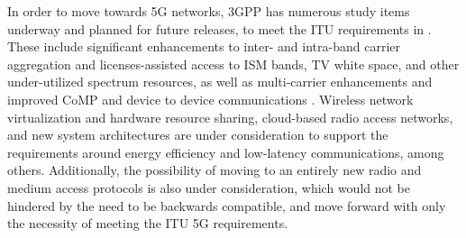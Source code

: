In order to move towards 5G networks, 3GPP has numerous study items underway and planned for future releases, to meet the ITU requirements in \cite{itu-2020}.  These include significant enhancements to inter- and intra-band carrier aggregation and licenses-assisted access to ISM bands, TV white space, and other under-utilized spectrum resources, as well as multi-carrier enhancements and improved CoMP and device to device communications \cite{lteA-gantt}.  Wireless network virtualization and hardware resource sharing, cloud-based radio access networks, and new system architectures are under consideration to support the requirements around energy efficiency and low-latency communications, among others.  Additionally, the possibility of moving to an entirely new radio and medium access protocols is also under consideration, which would not be hindered by the need to be backwards compatible, and move forward with only the necessity of meeting the ITU 5G requirements. 


